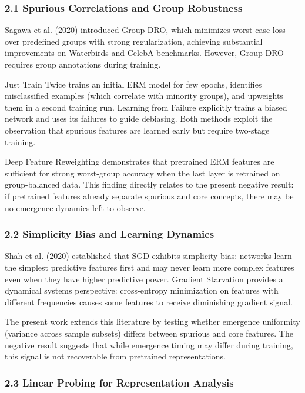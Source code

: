 
\subsubsection{2.1 Spurious Correlations and Group Robustness}

Sagawa et al. (2020) introduced Group DRO, which minimizes worst-case loss over predefined groups with strong regularization, achieving substantial improvements on Waterbirds and CelebA benchmarks. However, Group DRO requires group annotations during training.

Just Train Twice \citep{liu2021just} trains an initial ERM model for few epochs, identifies misclassified examples (which correlate with minority groups), and upweights them in a second training run. Learning from Failure \citep{nam2020learning} explicitly trains a biased network and uses its failures to guide debiasing. Both methods exploit the observation that spurious features are learned early but require two-stage training.

Deep Feature Reweighting \citep{kirichenko2022last} demonstrates that pretrained ERM features are sufficient for strong worst-group accuracy when the last layer is retrained on group-balanced data. This finding directly relates to the present negative result: if pretrained features already separate spurious and core concepts, there may be no emergence dynamics left to observe.

\subsubsection{2.2 Simplicity Bias and Learning Dynamics}

Shah et al. (2020) established that SGD exhibits simplicity bias: networks learn the simplest predictive features first and may never learn more complex features even when they have higher predictive power. Gradient Starvation \citep{pezeshki2021gradient} provides a dynamical systems perspective: cross-entropy minimization on features with different frequencies causes some features to receive diminishing gradient signal.

The present work extends this literature by testing whether emergence uniformity (variance across sample subsets) differs between spurious and core features. The negative result suggests that while emergence timing may differ during training, this signal is not recoverable from pretrained representations.

\subsubsection{2.3 Linear Probing for Representation Analysis}

